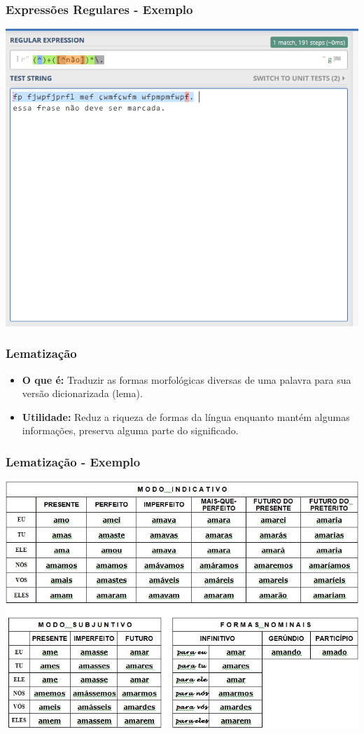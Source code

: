 \documentclass[11pt]{beamer}
\begin{document}
\begin{frame}
\frametitle{Expressões Regulares - Exemplo}
\begin{center}
	\includegraphics[width=\columnwidth,height=\textheight,keepaspectratio]{Regex_ruim.png}
\end{center}
\end{frame}


\begin{frame}
\frametitle{Lematização}
\begin{itemize}
	\item \textbf{O que é:} Traduzir as formas morfológicas diversas de uma palavra para sua versão dicionarizada (lema).\\
	\item \textbf{Utilidade:} Reduz a riqueza de formas da língua enquanto mantém algumas informações, preserva alguma parte do significado.\\
\end{itemize}
\end{frame}

\begin{frame}
\frametitle{Lematização - Exemplo}
\includegraphics[width=\columnwidth,height=\textheight,keepaspectratio]{verbos.jpg}
\end{frame}
\end{document}
